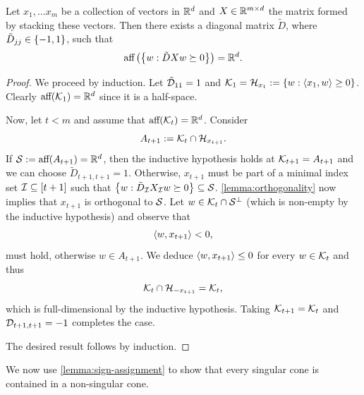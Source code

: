 \begin{lemma}\label{lemma:sign-assignment}
    Let \( x_1, \ldots x_m \) be a collection of vectors in \( \mathbb{R}^d \) and \( X \in \mathbb{R}^{m \times d} \) the matrix formed by stacking these vectors.
    Then there exists a diagonal matrix \( \tilde D \), where \( \tilde D_{jj} \in \left\{-1, 1\right\} \), such that
    \[
        \text{aff} \left(\left\{ w : \tilde D X w \succeq 0\right\}\right) = \mathbb{R}^d.
    \]
\end{lemma}
\begin{proof}
    We proceed by induction.
    Let \( \tilde {\mathcal{D}}_{11} = 1 \) and \( \mathcal{K}_1 = \mathcal{H}_{x_1} := \left\{w : \left\langle x_1, w\right\rangle \geq 0\right\} \).
    Clearly \( \text{aff} (\mathcal{K}_1) = \mathbb{R}^d \) since it is a half-space.

    Now, let \( t < m \) and assume that \( \text{aff} (\mathcal{K}_t) = \mathbb{R}^d \).
    Consider
    \[
        A_{t+1} := \mathcal{K}_t \cap \mathcal{H}_{x_{t+1}}.
    \]
    If \( \mathcal{S} := \text{aff} (A_{t+1}) = \mathbb{R}^d \), then the inductive hypothesis holds at \( \mathcal{K}_{t+1} = A_{t+1} \) and we can choose \( \tilde D_{t+1, t+1} = 1 \).
    Otherwise, \( x_{t+1} \) must be part of a minimal index set \( \mathcal{I} \subseteq [t+1] \) such that \( \left\{w : \tilde D_{\mathcal{I}} X_{\mathcal{I}} w \succeq 0 \right\} \subseteq \mathcal{S} \).
    \cref{lemma:orthogonality} now implies that \( x_{t+1} \) is orthogonal to \( \mathcal{S} \).
    Let \( w \in \mathcal{K}_{t} \cap \mathcal{S}^{\perp} \) (which is non-empty by the inductive hypothesis) and observe that
    \[
        \left\langle w, x_{t+1}\right\rangle < 0,
    \]
    must hold, otherwise \( w \in A_{t+1} \).
    We deduce \( \left\langle w, x_{t+1}\right\rangle \leq 0 \) for every \( w \in \mathcal{K}_{t} \) and thus
    \[
        \mathcal{K}_t \cap \mathcal{H}_{- x_{t+1}} = \mathcal{K}_t,
    \]
    which is full-dimensional by the inductive hypothesis.
    Taking \( \mathcal{K}_{t+1} = \mathcal{K}_t \) and \( \mathcal{D}_{t+1, t+1} = -1 \) completes the case.

    The desired result follows by induction.
\end{proof}

We now use \cref{lemma:sign-assignment} to show that every singular cone is contained in a non-singular cone.

